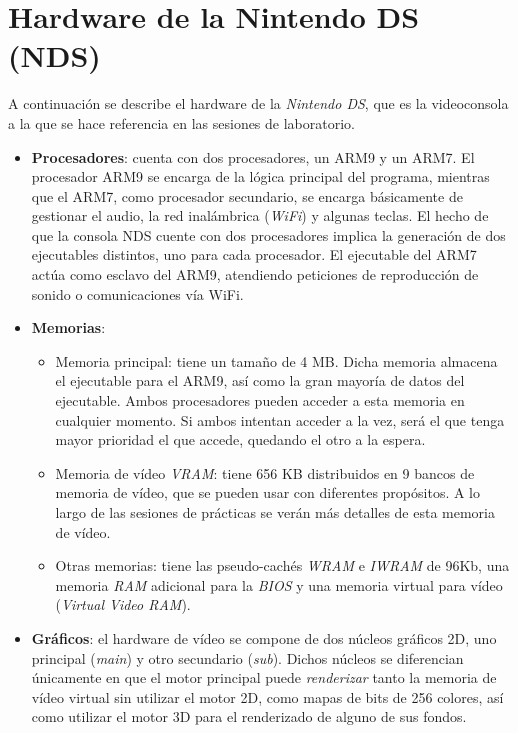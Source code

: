 \section{Hardware de la Nintendo DS (NDS)}

A continuación se describe el hardware de la \textit{Nintendo DS}, que es la videoconsola a la que se hace referencia en las sesiones de laboratorio.

\begin{itemize}
\item \textbf{Procesadores}: cuenta con dos procesadores, un ARM9 y un ARM7. El procesador ARM9 se encarga de la	lógica principal del programa, mientras que el ARM7, como procesador secundario, se encarga básicamente de gestionar el audio, la red inalámbrica (\textit{WiFi}) y algunas teclas. El hecho de que la consola NDS cuente con dos procesadores implica	la generación de dos ejecutables distintos, uno para cada procesador. El ejecutable del ARM7 actúa como esclavo del ARM9, atendiendo peticiones de reproducción de sonido o comunicaciones vía WiFi.
%	
\item \textbf{Memorias}:
	\begin{itemize}
	\item Memoria principal: tiene un tamaño de 4 MB. Dicha	memoria almacena el ejecutable para el ARM9, así como la gran mayoría de datos del ejecutable. Ambos procesadores pueden acceder a esta memoria en cualquier momento. Si ambos intentan acceder a la vez, será el que tenga mayor prioridad el que accede, quedando el otro a la espera.
	\item Memoria de vídeo \textit{VRAM}: tiene  656 KB  distribuidos en  9 bancos de memoria de vídeo, que se pueden usar con diferentes propósitos. A lo largo de las sesiones de prácticas se verán más detalles de esta memoria de vídeo.
	\item Otras memorias: tiene las pseudo-cachés \textit{WRAM} e \textit{IWRAM} de 96Kb, una memoria \textit{RAM} adicional para la \textit{BIOS} y una memoria virtual para vídeo (\textit{Virtual Video RAM}). 
	\end{itemize}
%
\item \textbf{Gráficos}: el hardware de vídeo se compone de dos núcleos gráficos 2D, uno	principal (\textit{main}) y otro secundario (\textit{sub}). Dichos núcleos se diferencian únicamente en que el motor principal puede \textit{renderizar} tanto la memoria de vídeo virtual sin utilizar el motor 2D, como mapas de bits de 256 colores, así como utilizar el motor 3D para el renderizado de alguno de sus fondos.

\end{itemize}
